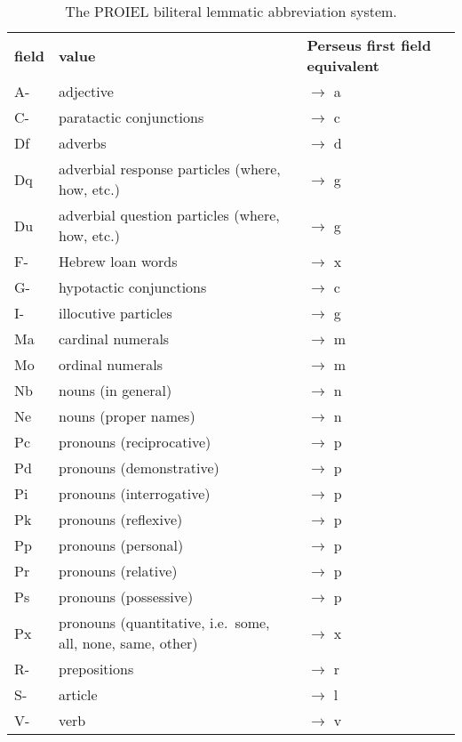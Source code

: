 \begin{table}
  \begin{tabular}{|l|l|l|}
    \hline
    \textbf{field}            & \textbf{value} & \textbf{Perseus first field equivalent} \\ \thickhline
    A- & adjective & $\rightarrow$ a \\ \hline
    C- & paratactic conjunctions & $\rightarrow$ c \\ \hline
    Df & adverbs & $\rightarrow$ d \\
    Dq & adverbial response particles (where, how, etc.) & $\rightarrow$ g \\
    Du & adverbial question particles (where, how, etc.)  & $\rightarrow$ g \\ \hline
    F- & Hebrew loan words & $\rightarrow$ x \\ \hline
    G- & hypotactic conjunctions & $\rightarrow$ c \\ \hline
    I- & illocutive particles & $\rightarrow$ g \\ \hline
    Ma & cardinal numerals & $\rightarrow$ m \\
    Mo & ordinal numerals & $\rightarrow$ m \\ \hline
    Nb & nouns (in general) & $\rightarrow$ n \\
    Ne & nouns (proper names) & $\rightarrow$ n \\ \hline
    Pc & pronouns (reciprocative) & $\rightarrow$ p \\
    Pd & pronouns (demonstrative) & $\rightarrow$ p \\
    Pi & pronouns (interrogative) & $\rightarrow$ p \\
    Pk & pronouns (reflexive) & $\rightarrow$ p \\
    Pp & pronouns (personal) & $\rightarrow$ p \\
    Pr & pronouns (relative) & $\rightarrow$ p \\
    Ps & pronouns (possessive) & $\rightarrow$ p \\
    Px & pronouns (quantitative, i.e.\ some, all, none, same, other) & $\rightarrow$ x \\ \hline
    R- & prepositions & $\rightarrow$ r \\ \hline
    S- & article & $\rightarrow$ l \\ \hline
    V- & verb & $\rightarrow$ v \\ \hline
    \hline
  \end{tabular}
  \caption{The PROIEL biliteral lemmatic abbreviation system.} \label{table:proiellemmata}
\end{table}

